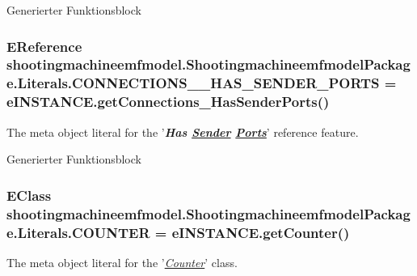 Generierter Funktionsblock \hypertarget{interfaceshootingmachineemfmodel_1_1_shootingmachineemfmodel_package_1_1_literals_a358f29496a0fad25e398d9a212e455a1}{
\subsubsection[{C\-O\-N\-N\-E\-C\-T\-I\-O\-N\-S\-\_\-\-\_\-\-H\-A\-S\-\_\-\-S\-E\-N\-D\-E\-R\-\_\-\-P\-O\-R\-T\-S}]{\setlength{\rightskip}{0pt plus 5cm}E\-Reference shootingmachineemfmodel.\-Shootingmachineemfmodel\-Package.\-Literals.\-C\-O\-N\-N\-E\-C\-T\-I\-O\-N\-S\-\_\-\-\_\-\-H\-A\-S\-\_\-\-S\-E\-N\-D\-E\-R\-\_\-\-P\-O\-R\-T\-S = e\-I\-N\-S\-T\-A\-N\-C\-E.\-get\-Connections\-\_\-\-Has\-Sender\-Ports()}}\label{interfaceshootingmachineemfmodel_1_1_shootingmachineemfmodel_package_1_1_literals_a358f29496a0fad25e398d9a212e455a1}
The meta object literal for the '{\itshape {\bfseries Has \hyperlink{interfaceshootingmachineemfmodel_1_1_sender}{Sender} \hyperlink{interfaceshootingmachineemfmodel_1_1_ports}{Ports}}}' reference feature.

Generierter Funktionsblock \hypertarget{interfaceshootingmachineemfmodel_1_1_shootingmachineemfmodel_package_1_1_literals_a771d1b163661cd049044d3f887529d1f}{
\subsubsection[{C\-O\-U\-N\-T\-E\-R}]{\setlength{\rightskip}{0pt plus 5cm}E\-Class shootingmachineemfmodel.\-Shootingmachineemfmodel\-Package.\-Literals.\-C\-O\-U\-N\-T\-E\-R = e\-I\-N\-S\-T\-A\-N\-C\-E.\-get\-Counter()}}\label{interfaceshootingmachineemfmodel_1_1_shootingmachineemfmodel_package_1_1_literals_a771d1b163661cd049044d3f887529d1f}
The meta object literal for the '\hyperlink{classshootingmachineemfmodel_1_1impl_1_1_counter_impl}{{\itshape Counter}}' class.

